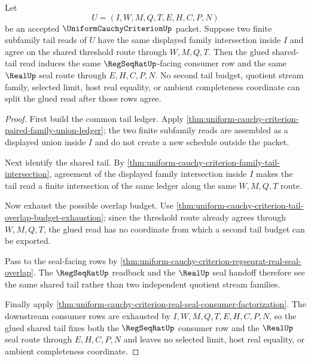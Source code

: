 \begin{theorem}
\label{thm:uniform-cauchy-criterion-shared-tail-gluing-determinacy}
Let
$$
U=(I,W,M,Q,T,E,H,C,P,N)
$$
be an accepted $\UniformCauchyCriterionUp$ packet. Suppose two finite subfamily tail reads of $U$ have the same displayed family intersection inside $I$ and agree on the shared threshold route through $W,M,Q,T$. Then the glued shared-tail read induces the same $\RegSeqRatUp$-facing consumer row and the same $\RealUp$ seal route through $E,H,C,P,N$. No second tail budget, quotient stream family, selected limit, host real equality, or ambient completeness coordinate can split the glued read after those rows agree.
\end{theorem}
\begin{proof}
First build the common tail ledger. Apply \autoref{thm:uniform-cauchy-criterion-paired-family-union-ledger}; the two finite subfamily reads are assembled as a displayed union inside $I$ and do not create a new schedule outside the packet.

Next identify the shared tail. By \autoref{thm:uniform-cauchy-criterion-family-tail-intersection}, agreement of the displayed family intersection inside $I$ makes the tail read a finite intersection of the same ledger along the same $W,M,Q,T$ route.

Now exhaust the possible overlap budget. Use \autoref{thm:uniform-cauchy-criterion-tail-overlap-budget-exhaustion}; since the threshold route already agrees through $W,M,Q,T$, the glued read has no coordinate from which a second tail budget can be exported.

Pass to the seal-facing rows by \autoref{thm:uniform-cauchy-criterion-regseqrat-real-seal-overlap}. The $\RegSeqRatUp$ readback and the $\RealUp$ seal handoff therefore see the same shared tail rather than two independent quotient stream families.

Finally apply \autoref{thm:uniform-cauchy-criterion-real-seal-consumer-factorization}. The downstream consumer rows are exhausted by $I,W,M,Q,T,E,H,C,P,N$, so the glued shared tail fixes both the $\RegSeqRatUp$ consumer row and the $\RealUp$ seal route through $E,H,C,P,N$ and leaves no selected limit, host real equality, or ambient completeness coordinate.
\end{proof}

